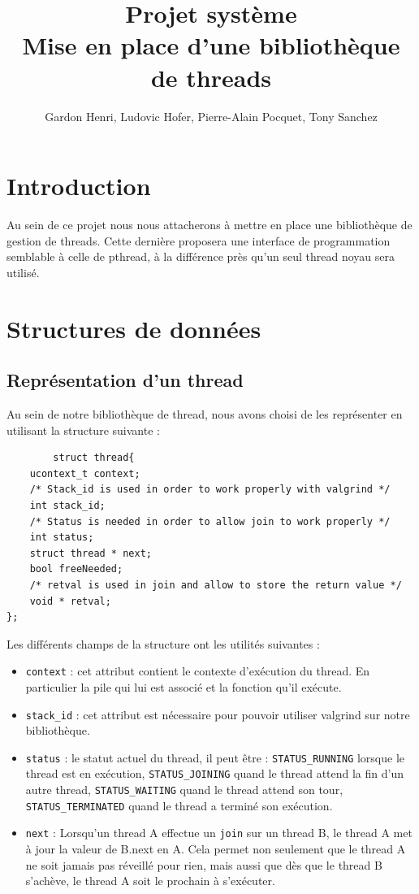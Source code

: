 \documentclass{article}
\title{Projet système \\ Mise en place d'une bibliothèque de threads}
\author{Gardon Henri, Ludovic Hofer, Pierre-Alain Pocquet, Tony
  Sanchez}
\begin{document}
	\maketitle
	\newpage
	\tableofcontents
	\newpage

	\section{Introduction}
	
	Au sein de ce projet nous nous attacherons à mettre en place une
    bibliothèque de gestion de threads. Cette dernière proposera une
    interface de programmation semblable à celle de pthread, à la
    différence près qu'un seul thread noyau sera utilisé.

	\section{Structures de données}

		\subsection{Représentation d'un thread}
		Au sein de notre bibliothèque de thread, nous avons choisi de les
		représenter en utilisant la structure suivante : \\
		\begin{verbatim}
		struct thread{
    ucontext_t context;
    /* Stack_id is used in order to work properly with valgrind */
    int stack_id;
    /* Status is needed in order to allow join to work properly */
    int status;
    struct thread * next;
    bool freeNeeded;
    /* retval is used in join and allow to store the return value */
    void * retval;
};
	\end{verbatim}
		Les différents champs de la structure ont les utilités 
		suivantes :
		\begin{itemize}
			\item \verb!context! : cet attribut contient le contexte
			d'exécution du thread. En particulier la pile qui lui est
			associé et la fonction qu'il exécute.
			\item \verb!stack_id! : cet attribut est nécessaire pour
			pouvoir utiliser valgrind sur notre bibliothèque.
			\item \verb!status! : le statut actuel du thread, il peut
			être : \verb!STATUS_RUNNING! lorsque le thread est en 
			exécution, \verb!STATUS_JOINING! quand le thread attend la
            fin d'un autre thread, \verb!STATUS_WAITING! quand le 
			thread attend son tour, \verb!STATUS_TERMINATED! quand 
			le thread a terminé son exécution.
			\item \verb!next! : Lorsqu'un thread A effectue un \verb!join!
              sur un thread B, le thread A met à jour la valeur de B.next en
              A. Cela permet non seulement que le thread A ne soit jamais pas
              réveillé pour rien, mais aussi que dès que le thread B
              s'achève, le thread A soit le prochain à s'exécuter.
		\end{itemize}
\end{document}
